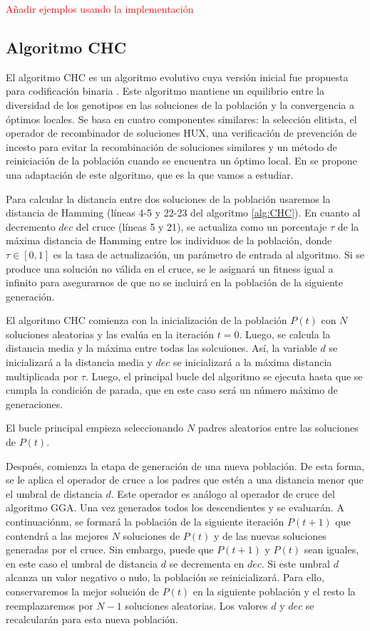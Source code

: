 \textcolor{red}{Añadir ejemplos usando la implementación}

\subsection{Algoritmo CHC}

El algoritmo CHC es un algoritmo evolutivo cuya versión inicial fue propuesta para codificación binaria \cite{CHC_1991}. Este algoritmo mantiene un equilibrio entre la diversidad de los genotipos en las soluciones de la población y la convergencia a óptimos locales. Se basa en cuatro componentes similares: la selección elitista, el operador de recombinador de soluciones HUX, una verificación de prevención de incesto para evitar la recombinación de soluciones similares y un método de reiniciación de la población cuando se encuentra un óptimo local. En \cite{Cuellar_etal} se propone una adaptación de este algoritmo, que es la que vamos a estudiar.

Para calcular la distancia entre dos soluciones de la población usaremos la distancia de Hamming (líneas 4-5 y 22-23 del algoritmo \ref{alg:CHC}). En cuanto al decremento $dec$ del cruce (líneas 5 y 21), se actualiza como un porcentaje $\tau$ de la máxima distancia de Hamming entre los individuos de la población, donde $\tau \in [0,1]$ es la tasa de actualización, un parámetro de entrada al algoritmo. Si se produce una solución no válida en el cruce, se le asignará un fitness igual a infinito para asegurarnos de que no se incluirá en la población de la siguiente generación.

El algoritmo CHC comienza con la inicialización de la población $P(t)$ con $N$ soluciones aleatorias y las evalúa en la iteración $t = 0$. Luego, se calcula la distancia media y la máxima entre todas las solcuiones. Así, la variable $d$ se inicializará a la distancia media y $dec$ se inicializará a la máxima distancia multiplicada por $\tau$. Luego, el principal bucle del algoritmo se ejecuta hasta que se cumpla la condición de parada, que en este caso será un número máximo de generaciones.

El bucle principal empieza seleccionando $N$ padres aleatorios entre las soluciones de $P(t)$.

Después, comienza la etapa de generación de una nueva población. De esta forma, se le aplica el operador de cruce a los padres que estén a una distancia menor que el umbral de distancia $d$. Este operador es análogo al operador de cruce del algoritmo GGA. Una vez generados todos los descendientes y se evaluarán. A continuaciónm, se formará la población de la siguiente iteración $P(t+1)$ que contendrá a las mejores $N$ soluciones de $P(t)$ y de las nuevas soluciones generadas por el cruce. Sin embargo, puede que $P(t+1)$ y $P(t)$ sean iguales, en este caso el umbral de distancia $d$ se decrementa en $dec$. Si este umbral $d$ alcanza un valor negativo o nulo, la población se reinicializará. Para ello, conservaremos la mejor solución de $P(t)$ en la siguiente población y el resto la reemplazaremos por $N-1$ soluciones aleatorias. Los valores $d$ y $dec$ se recalcularán para esta nueva población.

